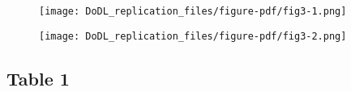\documentclass[
  12,
  letterpaper,
  DIV=11,
  numbers=noendperiod]{scrartcl}
\begin{document}
\begin{figure}

\begin{minipage}{0.50\linewidth}
\texttt{[image: DoDL\_replication\_files/figure-pdf/fig3-1.png]}\end{minipage}%
%
\begin{minipage}{0.50\linewidth}
\texttt{[image: DoDL\_replication\_files/figure-pdf/fig3-2.png]}\end{minipage}%

\end{figure}%

\newpage

\subsection{Table 1}\label{table-1}
\end{document}
